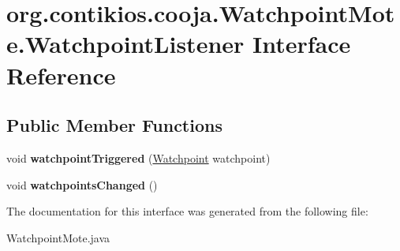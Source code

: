 \hypertarget{interfaceorg_1_1contikios_1_1cooja_1_1WatchpointMote_1_1WatchpointListener}{\section{org.\-contikios.\-cooja.\-Watchpoint\-Mote.\-Watchpoint\-Listener Interface Reference}
\label{interfaceorg_1_1contikios_1_1cooja_1_1WatchpointMote_1_1WatchpointListener}
}
\subsection*{Public Member Functions}
\begin{DoxyCompactItemize}
\item 
\hypertarget{interfaceorg_1_1contikios_1_1cooja_1_1WatchpointMote_1_1WatchpointListener_a20219204decf909d4993102671ad8b8e}{void {\bfseries watchpoint\-Triggered} (\hyperlink{interfaceorg_1_1contikios_1_1cooja_1_1Watchpoint}{Watchpoint} watchpoint)}\label{interfaceorg_1_1contikios_1_1cooja_1_1WatchpointMote_1_1WatchpointListener_a20219204decf909d4993102671ad8b8e}

\item 
\hypertarget{interfaceorg_1_1contikios_1_1cooja_1_1WatchpointMote_1_1WatchpointListener_ac6617c56488266f2d6709bbcdcda9583}{void {\bfseries watchpoints\-Changed} ()}\label{interfaceorg_1_1contikios_1_1cooja_1_1WatchpointMote_1_1WatchpointListener_ac6617c56488266f2d6709bbcdcda9583}

\end{DoxyCompactItemize}


The documentation for this interface was generated from the following file\-:\begin{DoxyCompactItemize}
\item 
Watchpoint\-Mote.\-java\end{DoxyCompactItemize}
